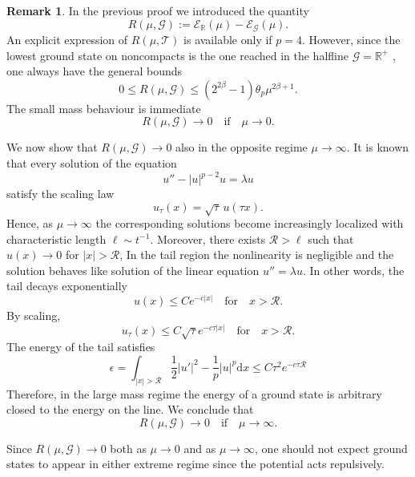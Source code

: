 \documentclass[12pt,a4paper]{amsart}
\theoremstyle{definition}
\newtheorem{remark}[definition]{Remark}
\theoremstyle{plain}
\def \G {\mathcal{G}}
\numberwithin{equation}{section}
\begin{document}
\begin{remark}
In the previous proof we introduced the quantity
    \begin{equation*}
       R(\mu, \G) :=  \mathcal{E}_{\mathbb{R}}(\mu)-\mathcal{E}_{\G}(\mu).
    \end{equation*}
An explicit expression of $R(\mu, \mathcal{T})$ is available only if $p=4$. 
However, since the lowest ground state on noncompacts is the one reached in the halfline $\G = \mathbb{R}^+$ \cite{Adami2015}, one always have the general bounds
\begin{equation}
    0 \leq R(\mu, \G) \leq (2^{2\beta}-1) \theta_p \mu^{2 \beta + 1}.
    \label{Restimates}
\end{equation}
The small mass behaviour is immediate
\begin{equation*}
    R(\mu,\G) \rightarrow 0 \quad \text{if} \quad \mu \rightarrow 0.
\end{equation*}

We now show that $R(\mu, \G) \rightarrow 0$ also in the opposite regime $\mu \rightarrow \infty$.
It is known \cite{Adami2016} that every solution of the equation
\begin{equation}
    u'' - |u|^{p-2} u = \lambda u
    \label{schrodinger}
\end{equation}
satisfy the scaling law 
\begin{equation}
    u_\tau(x) = \sqrt{\tau}\, u(\tau x).
\end{equation}
Hence, as $\mu \rightarrow \infty$ the corresponding solutions become increasingly localized with characteristic length $\ell \sim t^{-1}$.
Moreover, there exists $\mathcal R > \ell$ such that $u(x) \rightarrow 0$ for $|x| > \mathcal{R}$,  In the tail region the nonlinearity is negligible and the solution behaves like solution of the linear equation $u'' = \lambda u$.
In other words, the tail decays exponentially
\begin{equation}
    u(x) \leq C e^{- c |x|}  \quad \text{for} \quad x > \mathcal{R}.
\end{equation}
By scaling, 
\begin{equation}
    u_{\tau}(x) \leq C \sqrt{\tau} e^{- c \tau|x|}  \quad \text{for} \quad x > \mathcal{R}.
\end{equation}
The energy of the tail satisfies
\begin{equation}
    \epsilon = \int_{|x|> \mathcal{R}} \frac{1}{2} |u'|^2 - \frac{1}{p} |u|^p \textrm{d}x \leq C \tau^2 e^{-c\tau \mathcal{R}} 
\end{equation}
Therefore, in the large mass regime the energy of a ground state is arbitrary closed to the energy on the line.
We conclude that
$$R(\mu,\G) \rightarrow 0 \quad \text{if} \quad \mu \rightarrow \infty.$$

Since $R(\mu, \G) \rightarrow 0 $ both as $\mu \rightarrow0$ and as $\mu \rightarrow \infty$, one should not expect ground states to appear in either extreme regime since the potential acts repulsively.
\end{remark}
\end{document}
